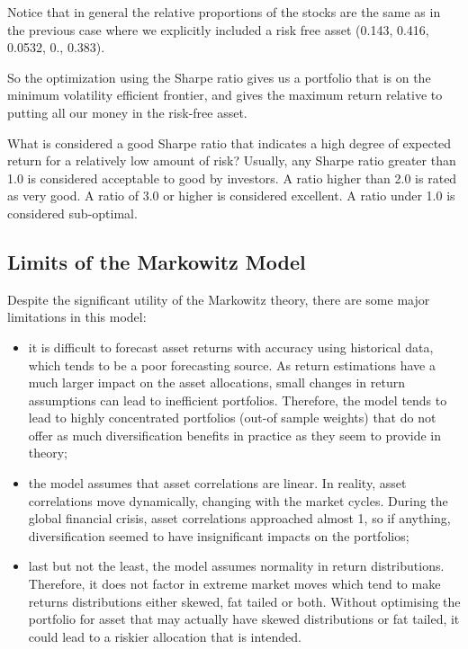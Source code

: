     Notice that in general the relative proportions of the stocks are the
same as in the previous case where we explicitly included a risk free
asset (0.143, 0.416, 0.0532, 0., 0.383).

So the optimization using the Sharpe ratio gives us a portfolio that is
on the minimum volatility efficient frontier, and gives the maximum
return relative to putting all our money in the risk-free asset.

What is considered a good Sharpe ratio that indicates a high degree of
expected return for a relatively low amount of risk? Usually, any Sharpe
ratio greater than 1.0 is considered acceptable to good by investors. A
ratio higher than 2.0 is rated as very good. A ratio of 3.0 or higher is
considered excellent. A ratio under 1.0 is considered sub-optimal.

\subsection{Limits of the Markowitz
Model}\label{limits-of-the-markowitz-model}

Despite the significant utility of the Markowitz theory, there are some
major limitations in this model:

\begin{itemize}
\tightlist
\item
  it is difficult to forecast asset returns with accuracy using
  historical data, which tends to be a poor forecasting source. As
  return estimations have a much larger impact on the asset allocations,
  small changes in return assumptions can lead to inefficient
  portfolios. Therefore, the model tends to lead to highly concentrated
  portfolios (out-of sample weights) that do not offer as much
  diversification benefits in practice as they seem to provide in
  theory;
\item
  the model assumes that asset correlations are linear. In reality,
  asset correlations move dynamically, changing with the market cycles.
  During the global financial crisis, asset correlations approached
  almost 1, so if anything, diversification seemed to have insignificant
  impacts on the portfolios;
\item
  last but not the least, the model assumes normality in return
  distributions. Therefore, it does not factor in extreme market moves
  which tend to make returns distributions either skewed, fat tailed or
  both. Without optimising the portfolio for asset that may actually
  have skewed distributions or fat tailed, it could lead to a riskier
  allocation that is intended.
\end{itemize}

